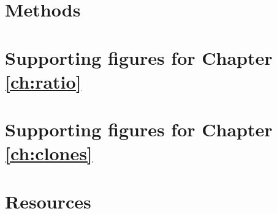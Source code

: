 \chapter{Methods}
\label{appendix:methods}


%

\chapter{Supporting figures for Chapter \ref{ch:ratio}}


\chapter{Supporting figures for Chapter \ref{ch:clones}}


%

\chapter{Resources}
\label{appendix:resources}


